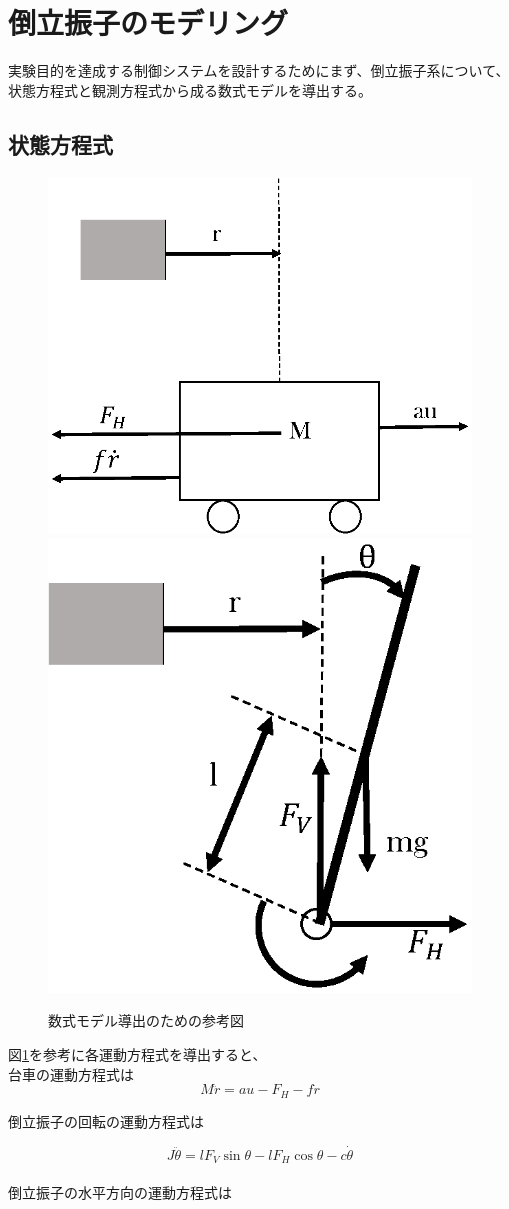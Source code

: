 \section{倒立振子のモデリング}
実験目的を達成する制御システムを設計するためにまず、倒立振子系について、状態方程式と観測方程式から成る数式モデルを導出する。
\subsection{状態方程式}
	\begin{figure}[H]
		\centering
		\includegraphics[width=0.4\linewidth]{gazo/cart.eps}
		\includegraphics[width=0.4\linewidth]{gazo/stick.eps}
		\caption{数式モデル導出のための参考図}
		\label{image:reference}
	\end{figure}	
	図\ref{image:reference}を参考に各運動方程式を導出すると、\\
	台車の運動方程式は\\
	
	\begin{equation}
		M\ddot{r}=au-F_{H}-f\dot{r}
		\label{eq:motion_eq_cart}
	\end{equation}
	
	倒立振子の回転の運動方程式は
	
	\begin{equation}
		J\ddot{\theta}=lF_{V}\sin \theta -lF_{H}\cos \theta -c\dot{\theta}
		\label{eq:rotemotion_eq_stick}
	\end{equation}
	\\
	倒立振子の水平方向の運動方程式は
	
